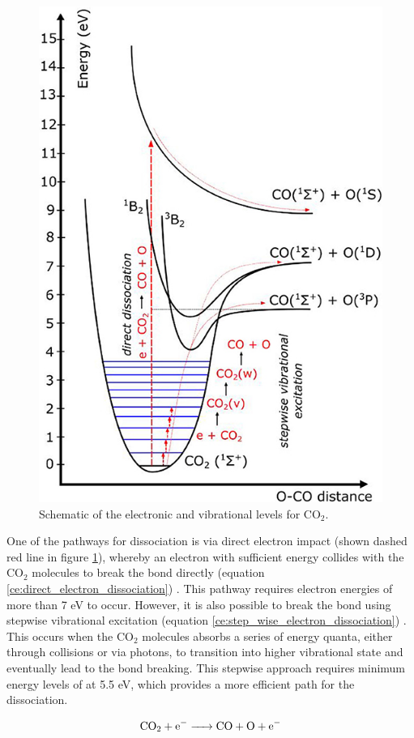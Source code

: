 \begin{figure}[h!]
	\centering
	\includegraphics[width=0.6\linewidth]{chapter_3/figures/co2_dissociation_energies.jpg}
	\caption{Schematic of the electronic and vibrational levels for CO$_2$\cite{Bogaerts2020}.}
	\label{fig:co2_dissociation_energies}
\end{figure}

One of the pathways for dissociation is via direct electron impact (shown dashed red line in figure \ref{fig:co2_dissociation_energies}), whereby an electron with sufficient energy collides with the CO$_2$ molecules to break the bond directly (equation \ref{ce:direct_electron_dissociation}) \cite{Bogaerts2020}. This pathway requires electron energies of more than 7 eV  to occur. However, it is also possible to break the  bond using stepwise vibrational excitation (equation \ref{ce:step_wise_electron_dissociation}) \cite{Bogaerts2020}. This occurs when the CO$_2$ molecules absorbs a series of energy quanta, either through collisions or via photons, to transition into higher vibrational state and eventually lead to the bond breaking. This stepwise approach requires minimum energy levels of at 5.5 eV, which provides a more efficient path for the dissociation.

\begin{equation}
    \ce{CO_2 + e^{-} -> CO + O + e^{-}}
    \label{ce:direct_electron_dissociation}
\end{equation}

